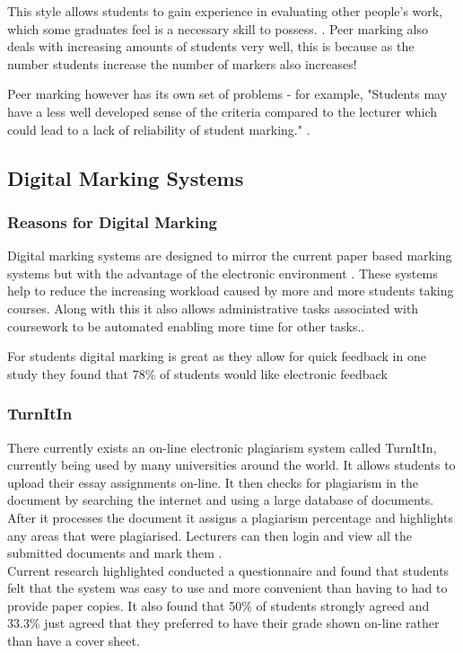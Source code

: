 \documentclass[12pt]{article}  %
\begin{document}
This style allows  students to gain experience in evaluating other people's work, which some graduates feel is a necessary skill to possess. \cite{langan_insights_????}. Peer marking also deals with increasing amounts of students very well, this is because as the number students increase the number of markers also increases!

Peer marking however has its own set of problems - for example, "Students may have a less well developed sense of the criteria compared to the lecturer which could lead to a lack of reliability of student marking." \cite{orsmond_use_2000}. 



\subsection{Digital Marking Systems}

\subsubsection{Reasons for Digital Marking}
Digital marking systems are designed to mirror the current paper based marking systems but with the advantage of the electronic environment \cite{heinrich_online_2003}. These systems help to reduce the increasing workload caused by more and more students taking courses. Along with this it also allows administrative tasks associated with coursework to be automated enabling more time for other tasks.\cite{joy_effective_1998}. 

For students digital marking is great as they allow for quick feedback in one study\cite{dahl_turnitin_2007} they found that 78\% of students would like electronic feedback

\subsubsection{TurnItIn}
There currently exists an on-line electronic plagiarism system called TurnItIn, \cite{_turnitin_????} currently being used by many universities around the world. It allows students to upload their essay assignments on-line. It then checks for plagiarism in the document by searching the internet and using a large database of documents. After it processes the document it assigns a plagiarism percentage and highlights any areas that were plagiarised. Lecturers can then login and view all the submitted documents and mark them .\\
Current research highlighted \cite{dahl_turnitin_2007} conducted a questionnaire and found that students felt that the system was easy to use and more convenient than having to had to provide paper copies. It also found that 50\% of students strongly agreed and 33.3\% just agreed that they preferred to have their grade shown on-line rather than have a cover sheet.
\end{document}
